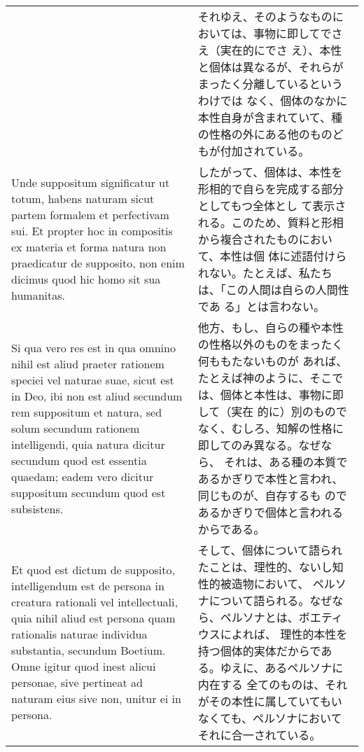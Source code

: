 \documentclass[10pt]{jsarticle} %
\begin{document}
\begin{longtable}{p{21em}p{21em}}
&

それゆえ、そのようなものにおいては、事物に即してでさえ（実在的にでさ
え）、本性と個体は異なるが、それらがまったく分離しているというわけでは
なく、個体のなかに本性自身が含まれていて、種の性格の外にある他のものど
もが付加されている。


\\

Unde suppositum significatur ut totum, habens naturam sicut partem
formalem et perfectivam sui. Et propter hoc in compositis ex materia
et forma natura non praedicatur de supposito, non enim dicimus quod
hic homo sit sua humanitas.

&

したがって、個体は、本性を形相的で自らを完成する部分としてもつ全体とし
て表示される。このため、質料と形相から複合されたものにおいて、本性は個
体に述語付けられない。たとえば、私たちは、「この人間は自らの人間性であ
る」とは言わない。


\\

Si qua vero res est in qua omnino nihil est aliud praeter rationem
speciei vel naturae suae, sicut est in Deo, ibi non est aliud secundum
rem suppositum et natura, sed solum secundum rationem intelligendi,
quia natura dicitur secundum quod est essentia quaedam; eadem vero
dicitur suppositum secundum quod est subsistens.


&

他方、もし、自らの種や本性の性格以外のものをまったく何ももたないものが
あれば、たとえば神のように、そこでは、個体と本性は、事物に即して（実在
的に）別のものでなく、むしろ、知解の性格に即してのみ異なる。なぜなら、
それは、ある種の本質であるかぎりで本性と言われ、同じものが、自存するも
のであるかぎりで個体と言われるからである。


\\

Et quod est dictum de supposito, intelligendum est de persona in
creatura rationali vel intellectuali, quia nihil aliud est persona
quam rationalis naturae individua substantia, secundum Boetium.  Omne
igitur quod inest alicui personae, sive pertineat ad naturam eius sive
non, unitur ei in persona.

&

そして、個体について語られたことは、理性的、ないし知性的被造物において、
ペルソナについて語られる。なぜなら、ペルソナとは、ボエティウスによれば、
理性的本性を持つ個体的実体だからである。ゆえに、あるペルソナに内在する
全てのものは、それがその本性に属していてもいなくても、ペルソナにおいて
それに合一されている。


\end{longtable}
\end{document}
